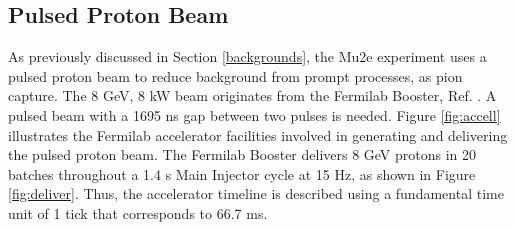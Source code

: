 \subsection{Pulsed Proton Beam}\label{pulsedprotonbeam}
As previously discussed in Section  \ref{backgrounds}, the Mu2e experiment uses a pulsed proton beam to reduce background from prompt processes, as pion capture. The 8 GeV, 8 kW beam originates from the Fermilab Booster, Ref. \cite{PhysRevAccelBeams.20.111003}. A pulsed beam with a 1695 ns gap between two pulses is needed. Figure \ref{fig:accell} illustrates the Fermilab accelerator facilities involved in generating and delivering the pulsed proton beam. The Fermilab Booster delivers 8 GeV protons in 20 batches throughout a 1.4 s Main Injector cycle at 15 Hz, as shown in Figure \ref{fig:deliver}. Thus, the accelerator timeline is described using a fundamental time unit of 1 tick that corresponds to 66.7 ms.

